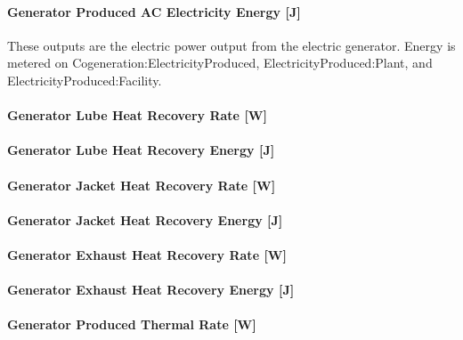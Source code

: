 \paragraph{Generator Produced AC Electricity Energy {[}J{]}}\label{generator-produced-electric-energy-j}

These outputs are the electric power output from the electric generator. Energy is metered on Cogeneration:ElectricityProduced, ElectricityProduced:Plant, and ElectricityProduced:Facility.

\paragraph{Generator Lube Heat Recovery Rate {[}W{]}}\label{generator-lube-heat-recovery-rate-w}

\paragraph{Generator Lube Heat Recovery Energy {[}J{]}}\label{generator-lube-heat-recovery-energy-j}

\paragraph{Generator Jacket Heat Recovery Rate {[}W{]}}\label{generator-jacket-heat-recovery-rate-w}

\paragraph{Generator Jacket Heat Recovery Energy {[}J{]}}\label{generator-jacket-heat-recovery-energy-j}

\paragraph{Generator Exhaust Heat Recovery Rate {[}W{]}}\label{generator-exhaust-heat-recovery-rate-w}

\paragraph{Generator Exhaust Heat Recovery Energy {[}J{]}}\label{generator-exhaust-heat-recovery-energy-j}

\paragraph{Generator Produced Thermal Rate {[}W{]}}\label{generator-produced-thermal-rate-w}

